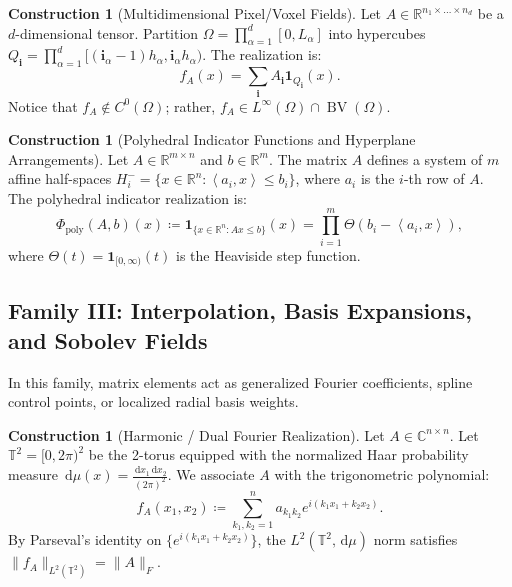 \documentclass[11pt,a4paper,reqno]{amsart}
\theoremstyle{definition}
\newtheorem{construction}[theorem]{Construction}
\numberwithin{equation}{section}
\providecommand{\R}{\mathbb{R}}
\newcommand{\C}{\mathbb{C}}
\newcommand{\Tor}{\mathbb{T}}
\providecommand{\BV}{\operatorname{BV}}
\newcommand{\inner}[2]{\left\langle #1, #2 \right\rangle}
\newcommand{\dif}{\,\mathrm{d}}
\begin{document}
\begin{construction}[Multidimensional Pixel/Voxel Fields]
Let $A \in \R^{n_1 \times \dots \times n_d}$ be a $d$-dimensional tensor. Partition $\Omega = \prod_{\alpha=1}^d [0, L_\alpha]$ into hypercubes $Q_{\mathbf{i}} = \prod_{\alpha=1}^d [(\mathbf{i}_\alpha-1) h_\alpha, \mathbf{i}_\alpha h_\alpha)$. The realization is:
\begin{equation}
    f_A(x) = \sum_{\mathbf{i}} A_{\mathbf{i}} \mathbf{1}_{Q_{\mathbf{i}}}(x).
\end{equation}
Notice that $f_A \notin C^0(\Omega)$; rather, $f_A \in L^\infty(\Omega) \cap \BV(\Omega)$.
\end{construction}

\begin{construction}[Polyhedral Indicator Functions and Hyperplane Arrangements]
Let $A \in \R^{m \times n}$ and $b \in \R^m$. The matrix $A$ defines a system of $m$ affine half-spaces $H_i^- = \{x \in \R^n \colon \inner{a_i}{x} \le b_i\}$, where $a_i$ is the $i$-th row of $A$. The polyhedral indicator realization is:
\begin{equation}
    \Phi_{\mathrm{poly}}(A, b)(x) \coloneqq \mathbf{1}_{\{x \in \R^n \colon Ax \le b\}}(x) = \prod_{i=1}^m \Theta(b_i - \inner{a_i}{x}),
\end{equation}
where $\Theta(t) = \mathbf{1}_{[0, \infty)}(t)$ is the Heaviside step function.
\end{construction}

\subsection{Family III: Interpolation, Basis Expansions, and Sobolev Fields}
\label{subsec:fam3}

In this family, matrix elements act as generalized Fourier coefficients, spline control points, or localized radial basis weights.

\begin{construction}[Harmonic / Dual Fourier Realization]
Let $A \in \C^{n \times n}$. Let $\Tor^2 = [0, 2\pi)^2$ be the 2-torus equipped with the normalized Haar probability measure $\dif\mu(x) = \frac{\dif x_1 \dif x_2}{(2\pi)^2}$. We associate $A$ with the trigonometric polynomial:
\begin{equation}
    \label{eq:fourier_realization}
    f_A(x_1, x_2) \coloneqq \sum_{k_1, k_2 = 1}^n a_{k_1 k_2} e^{i (k_1 x_1 + k_2 x_2)}.
\end{equation}
By Parseval's identity on $\{e^{i(k_1 x_1 + k_2 x_2)}\}$, the $L^2(\Tor^2, \dif\mu)$ norm satisfies $\|f_A\|_{L^2(\Tor^2)} = \|A\|_F$.
\end{construction}
\end{document}
